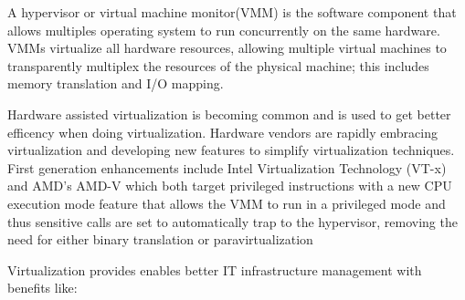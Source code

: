 \documentclass[12pt,a4paper]{report}
\begin{document}


A hypervisor or virtual machine monitor(VMM) is the software component that allows multiples operating system to run
concurrently on the same hardware. VMMs virtualize all hardware resources, allowing multiple virtual machines to transparently multiplex the resources of the physical machine; this includes memory translation and I/O mapping.

Hardware assisted virtualization is becoming common and is used to get better efficency when doing virtualization. Hardware vendors are rapidly embracing virtualization and developing new features
to simplify virtualization techniques. First generation enhancements include Intel
Virtualization Technology (VT-x) and AMD's AMD-V which both target privileged 
instructions with a new CPU execution mode feature that allows the VMM to run in a privileged mode and thus  sensitive calls are set to automatically trap to the hypervisor, removing the need for either binary translation or paravirtualization\cite{website:vmware}



Virtualization provides enables better IT infrastructure management with benefits like\cite{website:intel-VT}:
\end{document}
